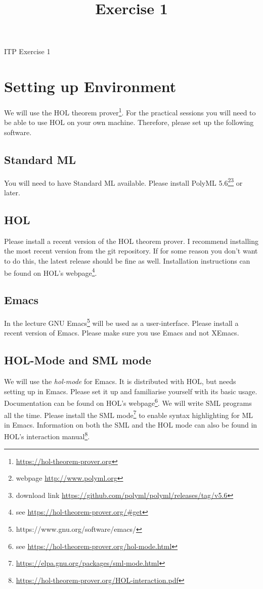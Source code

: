 \documentclass[a4paper,10pt,oneside]{scrartcl}
\title{Exercise 1}
\begin{document}
\begin{center}
ITP Exercise 1
\end{center}
\bigskip


\section{Setting up Environment}

We will use the HOL theorem prover\footnote{\url{https://hol-theorem-prover.org}}. 
For the practical sessions you will need to be able to use HOL on your own machine. Therefore, please set up the following software.

\subsection{Standard ML}

You will need to have Standard ML available. Please install PolyML 5.6\footnote{webpage \url{http://www.polyml.org}}\footnote{download link \url{https://github.com/polyml/polyml/releases/tag/v5.6}} or later.

\subsection{HOL}

Please install a recent version of the HOL theorem prover. I recommend installing the most recent version from the git repository. If for some reason you don't want to do this, the latest release should be fine as well. Installation instructions can be found on HOL's webpage\footnote{see \url{https://hol-theorem-prover.org/\#get}}.

\subsection{Emacs}

In the lecture GNU Emacs\footnote{https://www.gnu.org/software/emacs/} will be used as a user-interface. Please install a recent version of Emacs. Please make sure you use Emacs and not XEmacs. 

\subsection{HOL-Mode and SML mode}
We will use the \emph{hol-mode} for Emacs. It is distributed with HOL, but needs setting up in Emacs. Please set it up and familiarise yourself with its basic usage. Documentation can be found on HOL's webpage\footnote{see \url{https://hol-theorem-prover.org/hol-mode.html}}.
We will write SML programs all the time. Please install the SML mode\footnote{\url{https://elpa.gnu.org/packages/sml-mode.html}} to enable syntax highlighting for ML in Emacs.
Information on both the SML and the HOL mode can also be found in HOL's interaction
manual\footnote{\url{https://hol-theorem-prover.org/HOL-interaction.pdf}}.
\end{document}
